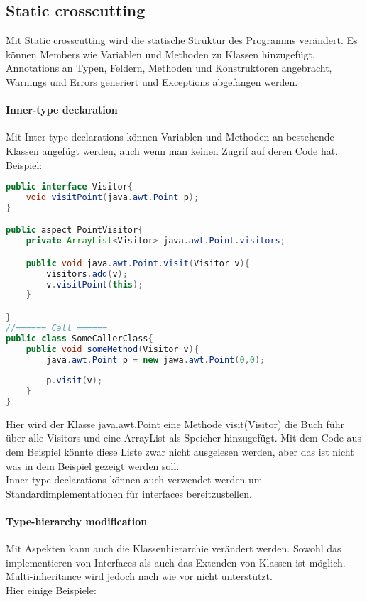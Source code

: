 

\subsection{Static crosscutting}

Mit Static crosscutting wird die statische Struktur des Programms verändert. Es können Members wie Variablen und Methoden zu Klassen hinzugefügt, Annotations an Typen, Feldern, Methoden und Konstruktoren angebracht, Warnings und Errors generiert und Exceptions abgefangen werden.

\paragraph{Inner-type declaration}

Mit Inter-type declarations können Variablen und Methoden an bestehende Klassen angefügt werden, auch wenn man keinen Zugrif auf deren Code hat.\\Beispiel:\\


\begin{lstlisting}[language=Java]
public interface Visitor{
	void visitPoint(java.awt.Point p);
}

public aspect PointVisitor{
	private ArrayList<Visitor> java.awt.Point.visitors;

	public void java.awt.Point.visit(Visitor v){
		visitors.add(v);
		v.visitPoint(this);
	}

}
//====== Call ======
public class SomeCallerClass{
	public void someMethod(Visitor v){
		java.awt.Point p = new jawa.awt.Point(0,0);
		
		p.visit(v);
	}
}
\end{lstlisting}

Hier wird der Klasse java.awt.Point eine Methode visit(Visitor) die Buch führ über alle Visitors und eine ArrayList als Speicher hinzugefügt. Mit dem Code aus dem Beispiel könnte diese Liste zwar nicht ausgelesen werden, aber das ist nicht was in dem Beispiel gezeigt werden soll.\\
Inner-type declarations können auch verwendet werden um Standardimplementationen für interfaces bereitzustellen.

\paragraph{Type-hierarchy modification}
Mit Aspekten kann auch die Klassenhierarchie verändert werden. Sowohl das implementieren von Interfaces als auch das Extenden von Klassen ist möglich. Multi-inheritance wird jedoch nach wie vor nicht unterstützt.\\
Hier einige Beispiele:\\

